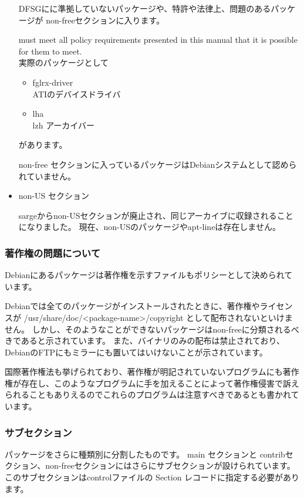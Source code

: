 \documentclass[mingoth,a4paper]{jsarticle}
\begin{document}
\begin{itemize}
	DFSGにに準拠していないパッケージや、特許や法律上、問題のあるパッケージが non-freeセクションに入ります。

must meet all policy requirements presented in this manual that it is possible for them to meet. 
\\		
	実際のパッケージとして
	\begin{itemize}
 	\item fglrx-driver \\
 		ATIのデバイスドライバ
 	\item lha \\ 
 		lzh アーカイバー
	\end{itemize}
	があります。

	non-free セクションに入っているパッケージはDebianシステムとして認められていません。
		
 \item non-US セクション
 
	sargeからnon-USセクションが廃止され、同じアーカイブに収録されることになりました。
	現在、non-USのパッケージやapt-lineは存在しません。

\end{itemize}

\subsubsection{著作権の問題について}
Debianにあるパッケージは著作権を示すファイルもポリシーとして決められています。


Debianでは全てのパッケージがインストールされたときに、著作権やライセンスが /usr/share/doc/<package-name>/copyright として配布されないといけません。
しかし、そのようなことができないパッケージはnon-freeに分類されるべきであると示されています。
また、バイナリのみの配布は禁止されており、DebianのFTPにもミラーにも置いてはいけないことが示されています。


国際著作権法も挙げられており、著作権が明記されていないプログラムにも著作権が存在し、このようなプログラムに手を加えることによって著作権侵害で訴えられることもありえるのでこれらのプログラムは注意すべきであるとも書かれています。
	
\subsubsection{サブセクション}
パッケージをさらに種類別に分割したものです。
main セクションと contribセクション、non-freeセクションにはさらにサブセクションが設けられています。
このサブセクションはcontrolファイルの Section レコードに指定する必要があります。
\end{document}

